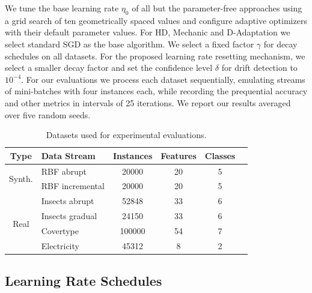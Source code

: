 \documentclass[runningheads]{llncs}
\begin{document}
We tune the base learning rate $\eta_0$ of all but the parameter-free approaches using a grid search of ten geometrically spaced values and configure adaptive optimizers with their default parameter values. For HD, Mechanic and D-Adaptation we select standard SGD as the base algorithm.
We select a fixed factor $\gamma$ for decay schedules on all datasets.
For the proposed learning rate resetting mechanism, we select a smaller decay factor and set the confidence level $\delta$ for drift detection to $10^{-4}$.
For our evaluations we process each dataset sequentially, emulating streams of mini-batches with four instances each, while recording the prequential accuracy and other metrics in intervals of 25 iterations.
We report our results averaged over five random seeds.

\begin{table}[hb]
	\centering
	\scriptsize
	\caption{Datasets used for experimental evaluations.}
	\begin{tabular}{@{}clcccc@{}}
		\toprule
		Type                    & Data Stream               & Instances & Features & Classes \\
		\midrule
		\multirow{2}{*}{Synth.} & RBF abrupt                & 20000     & 20       & 5       \\
		                        & RBF incremental           & 20000     & 20       & 5       \\
		\midrule
		\multirow{5}{*}{Real}   & Insects abrupt            & 52848     & 33       & 6       \\
		                        & Insects gradual           & 24150     & 33       & 6       \\
		                        & Covertype\footnotemark[3] & 100000    & 54       & 7       \\
		                        & Electricity               & 45312     & 8        & 2       \\
		\bottomrule
	\end{tabular}
	\label{tab:datasets}
\end{table}

\subsection{Learning Rate Schedules}
\end{document}

